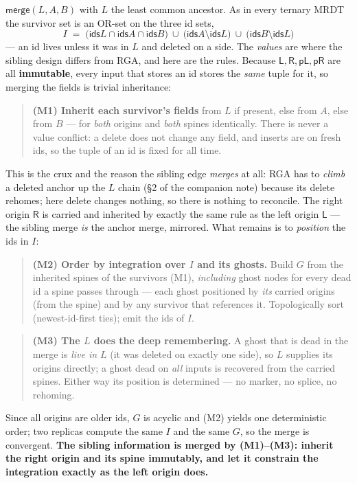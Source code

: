 \documentclass[11pt]{article}
\newcommand{\lo}{\mathsf{L}}
\newcommand{\ro}{\mathsf{R}}
\newcommand{\pL}{\mathsf{pL}}
\newcommand{\pR}{\mathsf{pR}}
\newcommand{\ids}{\mathsf{ids}}
\newcommand{\mrg}{\mathsf{merge}}
\newcommand{\lca}{L}
\begin{document}
$\mrg(\lca, A, B)$ with $\lca$ the least common ancestor. As in every ternary
MRDT the survivor set is an OR-set on the three id sets,
\[
  I \;=\; \bigl(\ids\lca \cap \ids A \cap \ids B\bigr)\ \cup\
          \bigl(\ids A \setminus \ids\lca\bigr)\ \cup\
          \bigl(\ids B \setminus \ids\lca\bigr)
\]
--- an id lives unless it was in $\lca$ and deleted on a side. The \emph{values}
are where the sibling design differs from RGA, and here are the rules. Because
$\lo,\ro,\pL,\pR$ are all \textbf{immutable}, every input that stores an id
stores the \emph{same} tuple for it, so merging the fields is trivial
inheritance:
\begin{quote}
\textbf{(M1) Inherit each survivor's fields} from $\lca$ if present, else from
$A$, else from $B$ --- for \emph{both} origins and \emph{both} spines identically.
There is never a value conflict: a delete does not change any field, and inserts
are on fresh ids, so the tuple of an id is fixed for all time.
\end{quote}
This is the crux and the reason the sibling edge \emph{merges} at all: RGA has to
\emph{climb} a deleted anchor up the $\lca$ chain (\S2 of the companion note)
because its delete rehomes; here delete changes nothing, so there is nothing to
reconcile. The right origin $\ro$ is carried and inherited by exactly the same
rule as the left origin $\lo$ --- the sibling merge \emph{is} the anchor merge,
mirrored. What remains is to \emph{position} the ids in $I$:
\begin{quote}
\textbf{(M2) Order by integration over $I$ and its ghosts.} Build $G$ from the
inherited spines of the survivors (M1), \emph{including} ghost nodes for every
dead id a spine passes through --- each ghost positioned by \emph{its} carried
origins (from the spine) and by any survivor that references it. Topologically
sort (newest-id-first ties); emit the ids of $I$.
\end{quote}
\begin{quote}
\textbf{(M3) The $\lca$ does the deep remembering.} A ghost that is dead in the
merge is \emph{live in $\lca$} (it was deleted on exactly one side), so $\lca$
supplies its origins directly; a ghost dead on \emph{all} inputs is recovered
from the carried spines. Either way its position is determined --- no marker, no
splice, no rehoming.
\end{quote}
Since all origins are older ids, $G$ is acyclic and (M2) yields one deterministic
order; two replicas compute the same $I$ and the same $G$, so the merge is
convergent. \textbf{The sibling information is merged by (M1)--(M3): inherit the
right origin and its spine immutably, and let it constrain the integration
exactly as the left origin does.}
\end{document}
